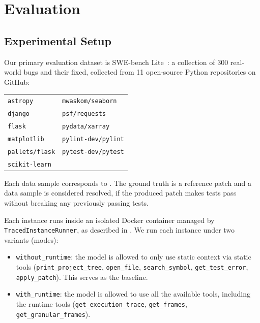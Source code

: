 \chapter{Evaluation}
\label{ch:evaluation}

\section{Experimental Setup}
\label{sec:eval-setup}

Our primary evaluation dataset is SWE-bench Lite~\citep{jimenez2023swebench}: a collection of 300 real-world bugs and their fixed, collected from 11 open-source Python repositories on GitHub:

\begin{center}
\begin{tabular}{ll}
\texttt{astropy}            & \texttt{mwaskom/seaborn}   \\
\texttt{django}             & \texttt{psf/requests}      \\
\texttt{flask}              & \texttt{pydata/xarray}     \\
\texttt{matplotlib}         & \texttt{pylint-dev/pylint} \\
\texttt{pallets/flask}      & \texttt{pytest-dev/pytest} \\
\texttt{scikit-learn}       &                            \\
\end{tabular}
\end{center}

Each data sample corresponds to . The ground truth is a reference patch and a data sample is considered resolved, if the produced patch makes tests pass without breaking any previously passing tests.

Each instance runs inside an isolated Docker container managed by \texttt{TracedInstanceRunner}, as described in . We run each instance under two variants (modes):

\begin{itemize}\setlength{\itemsep}{6pt}
    \item \texttt{without\_runtime}: the model is allowed to only use static context via static tools (\texttt{print\_project\_tree}, \texttt{open\_file}, \texttt{search\_symbol}, \texttt{get\_test\_error}, \texttt{apply\_patch}). This serves as the baseline.
    \item \texttt{with\_runtime}: the model is allowed to use all the available tools, including the runtime tools (\texttt{get\_execution\_trace}, \texttt{get\_frames}, \texttt{get\_granular\_frames}).
\end{itemize}

